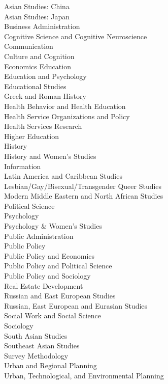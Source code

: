 \begin{enumsubsection}
\begin{enumsubsubsection}
\begin{description}
Asian Studies: China\\
Asian Studies: Japan\\
Business Administration\\
Cognitive Science and Cognitive Neuroscience\\
Communication\\
Culture and Cognition\\
Economics Education\\
Education and Psychology\\
Educational Studies\\
Greek and Roman History\\
Health Behavior and Health Education\\
Health Service Organizations and Policy\\
Health Services Research\\
Higher Education\\
History\\
History and Women's Studies\\
Information\\
Latin America and Caribbean Studies\\
Lesbian/Gay/Bisexual/Transgender Queer Studies\\
Modern Middle Eastern and North African Studies\\
Political Science\\
Psychology\\
Psychology \& Women's Studies\\
Public Administration\\
Public Policy\\
Public Policy and Economics\\
Public Policy and Political Science\\
Public Policy and Sociology\\
Real Estate Development\\
Russian and East European Studies\\
Russian, East European and Eurasian Studies\\
Social Work and Social Science\\
Sociology\\
South Asian Studies\\
Southeast Asian Studies\\
Survey Methodology\\
Urban and Regional Planning\\
Urban, Technological, and Environmental Planning\\

\end{description}
\end{enumsubsubsection}
\end{enumsubsection}
